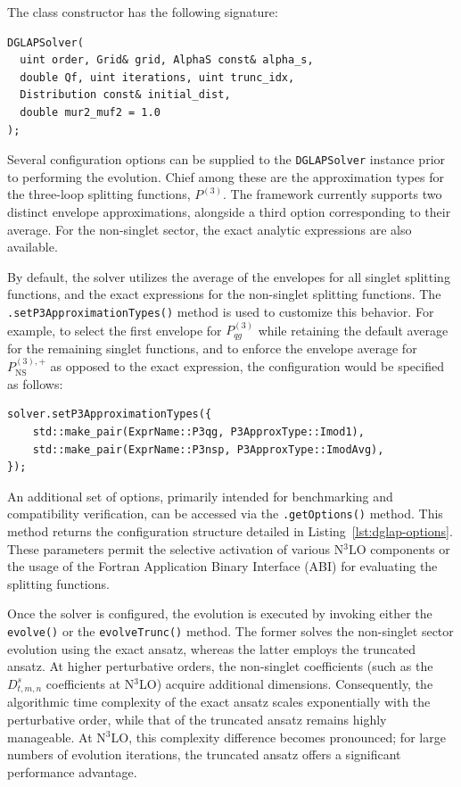 \documentclass[preprint,12pt]{elsarticle}
\begin{document}
The class constructor has the following signature:

\begin{verbatim}
DGLAPSolver(
  uint order, Grid& grid, AlphaS const& alpha_s,
  double Qf, uint iterations, uint trunc_idx,
  Distribution const& initial_dist,
  double mur2_muf2 = 1.0
);
\end{verbatim}

Several configuration options can be supplied to the \texttt{DGLAPSolver} 
instance prior to performing the evolution. Chief among these are the approximation 
types for the three-loop splitting functions, $P^{(3)}$. The framework currently supports 
two distinct envelope approximations, alongside a third option corresponding to their 
average. For the non-singlet sector, the exact analytic expressions are also available.

By default, the solver utilizes the average of the envelopes for all singlet splitting 
functions, and the exact expressions for the non-singlet splitting functions.
The \texttt{.setP3ApproximationTypes()} method is used to customize this behavior. For example, to 
select the first envelope for $P^{(3)}_{qg}$ while retaining the default average for the 
remaining singlet functions, and to enforce the envelope average for $P_{\mathrm{NS}}^{(3),+}$
as opposed to the exact expression, the configuration would be specified as follows:
\begin{verbatim}
solver.setP3ApproximationTypes({
    std::make_pair(ExprName::P3qg, P3ApproxType::Imod1),
    std::make_pair(ExprName::P3nsp, P3ApproxType::ImodAvg),
});
\end{verbatim}

An additional set of options, primarily intended for benchmarking 
and compatibility verification, can be accessed via the \texttt{.getOptions()} 
method. This method returns the configuration structure detailed in Listing~\ref{lst:dglap-options}. 
These parameters permit the selective activation of various N$^3$LO components
or the usage of the Fortran Application Binary Interface (ABI) for evaluating the splitting 
functions.

Once the solver is configured, the evolution is executed by invoking either 
the \texttt{evolve()} or the \texttt{evolveTrunc()} method. The 
former solves the non-singlet sector evolution using the exact ansatz, whereas 
the latter employs the truncated ansatz. At higher perturbative orders, 
the non-singlet coefficients (such as the $D^{s}_{t,m,n}$ coefficients at N$^3$LO) 
acquire additional dimensions. Consequently, the algorithmic time complexity of 
the exact ansatz scales exponentially with the perturbative order, while that of 
the truncated ansatz remains highly manageable. At N$^3$LO, this complexity difference 
becomes pronounced; for large numbers of evolution iterations, the truncated ansatz 
offers a significant performance advantage.
\end{document}
